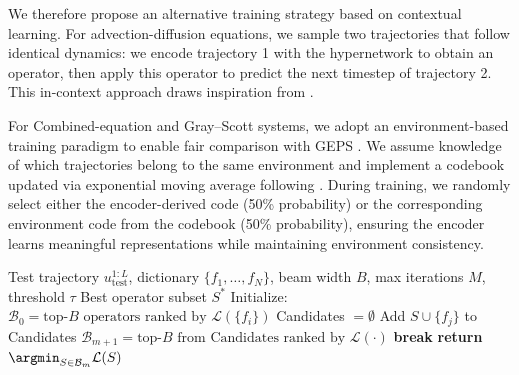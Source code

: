 \documentclass{article}
\newcommand{\RETURN}{\STATE \textbf{return }}
\theoremstyle{plain}
\theoremstyle{definition}
\theoremstyle{remark}
\begin{document}
We therefore propose an alternative training strategy based on contextual learning. For advection-diffusion equations, we sample two trajectories that follow identical dynamics: we encode trajectory 1 with the hypernetwork to obtain an operator, then apply this operator to predict the next timestep of trajectory 2. This in-context approach draws inspiration from \citet{serrano2025zebra}.

For Combined-equation and Gray--Scott systems, we adopt an environment-based training paradigm to enable fair comparison with GEPS \cite{koupai2024geps}. We assume knowledge of which trajectories belong to the same environment and implement a codebook updated via exponential moving average following \cite{oord2017neural}. During training, we randomly select either the encoder-derived code (50\% probability) or the corresponding environment code from the codebook (50\% probability), ensuring the encoder learns meaningful representations while maintaining environment consistency.



\begin{algorithm}
\small
\caption{Beam Search Operator Composition}
\label{alg:beam_search}
\begin{algorithmic}[1]
\REQUIRE Test trajectory $u_{\text{test}}^{1:L}$, dictionary $\{f_1, \ldots, f_N\}$, beam width $B$, max iterations $M$, threshold $\tau$
\ENSURE Best operator subset $S^*$
\STATE Initialize: $\mathcal{B}_0 = \text{top-}B \text{ operators ranked by } \mathcal{L}(\{f_i\})$
    \STATE Candidates $= \emptyset$
            \STATE Add $S \cup \{f_j\}$ to Candidates
        \ENDFOR
    \ENDFOR
    \STATE $\mathcal{B}_{m+1} = \text{top-}B \text{ from Candidates ranked by } \mathcal{L}(\cdot)$
        \STATE \textbf{break}
    \ENDIF
\ENDFOR
\RETURN $\argmin_{S \in \mathcal{B}_m} \mathcal{L}(S)$
\end{algorithmic}
\end{algorithm}
\end{document}
